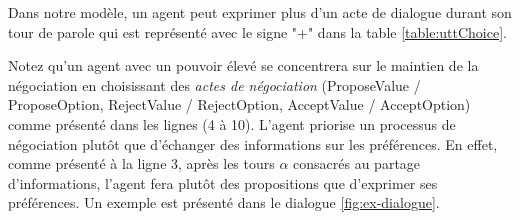 		Dans notre modèle, un agent peut exprimer plus d'un acte de dialogue durant son tour de parole qui est représenté avec le signe "+" dans la table \ref {table:uttChoice}.
		
		Notez qu'un agent avec un pouvoir élevé se concentrera sur le maintien de la négociation en choisissant  des \emph{actes de négociation} (ProposeValue / ProposeOption, RejectValue / RejectOption, AcceptValue / AcceptOption) comme présenté dans les lignes (4 à 10). L'agent priorise un processus de négociation plutôt que d'échanger des informations sur les préférences. En effet, comme présenté à la ligne 3, après les tours $ \alpha $ consacrés au partage d'informations, l'agent fera plutôt des propositions que d'exprimer ses préférences. Un exemple est présenté dans le dialogue \ref {fig:ex-dialogue}.
		
